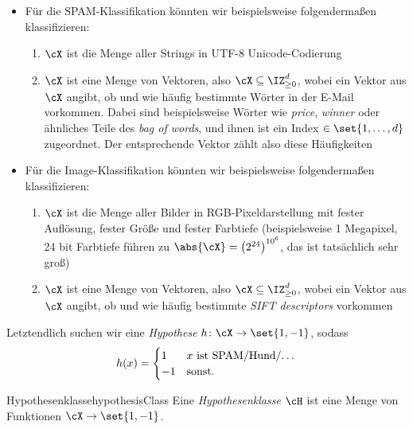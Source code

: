 \documentclass[language=ngerman,algolist,acrolist]{TemplateLecture}
\begin{document}
\begin{expl}\leavevmode
    \begin{itemize}
        \item Für die SPAM-Klassifikation könnten wir beispielsweise folgendermaßen klassifizieren:
        \begin{enumerate}
            \item $\cX$ ist die Menge aller Strings in UTF-8 Unicode-Codierung
            \item $\cX$ ist eine Menge von Vektoren, also $\cX \subseteq \IZ_{\geq 0}^d$, wobei ein Vektor aus $\cX$ angibt, ob und wie häufig bestimmte Wörter in der E-Mail vorkommen. Dabei sind beispielsweise Wörter wie \emph{price}, \emph{winner} oder ähnliches Teile des \emph{bag of words}, und ihnen ist ein Index $\in \set{1,\ldots,d}$ zugeordnet. Der entsprechende Vektor zählt also diese Häufigkeiten
        \end{enumerate}
        \item Für die Image-Klassifikation könnten wir beispielsweise folgendermaßen klassifizieren:
        \begin{enumerate}
            \item $\cX$ ist die Menge aller Bilder in RGB-Pixeldarstellung mit fester Auflösung, fester Größe und fester Farbtiefe (beispielsweise 1 Megapixel, 24 bit Farbtiefe führen zu $\abs{\cX} = \left(2^{24}\right)^{10^6}$, das ist tatsächlich sehr groß)
            \item $\cX$ ist eine Menge von Vektoren, also $\cX \subseteq \IZ_{\geq 0}^d$, wobei ein Vektor aus $\cX$ angibt, ob und wie häufig bestimmte \emph{SIFT descriptors} vorkommen
        \end{enumerate}
    \end{itemize}
\end{expl}

Letztendlich suchen wir eine \emph{Hypothese} $h \colon \cX \to \set{1, -1}$, sodass
\begin{equation*}
    h(x) = \begin{cases}
        1 & \text{$x$ ist SPAM/Hund/\dots} \\
        -1 & \text{sonst}.
    \end{cases}
\end{equation*}

\begin{defi}{Hypothesenklasse}{hypothesisClass}
    Eine \emph{Hypothesenklasse} $\cH$ ist eine Menge von Funktionen $\cX \to \set{1,-1}$.
\end{defi}
\end{document}
